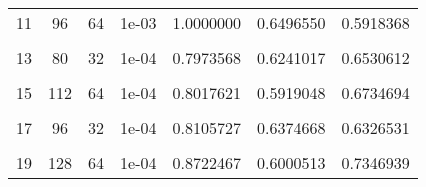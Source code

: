 \documentclass[
]{article}
\begin{document}
\begin{longtable}[t]{ccccccc}
11 & 96 & 64 & 1e-03 & 1.0000000 & 0.6496550 & 0.5918368\\
\cellcolor{gray!15}{12} & \cellcolor{gray!15}{128} & \cellcolor{gray!15}{48} & \cellcolor{gray!15}{1e-03} & \cellcolor{gray!15}{1.0000000} & \cellcolor{gray!15}{0.5759395} & \cellcolor{gray!15}{0.6326531}\\
13 & 80 & 32 & 1e-04 & 0.7973568 & 0.6241017 & 0.6530612\\
\cellcolor{gray!15}{14} & \cellcolor{gray!15}{64} & \cellcolor{gray!15}{64} & \cellcolor{gray!15}{1e-04} & \cellcolor{gray!15}{1.0000000} & \cellcolor{gray!15}{0.6047984} & \cellcolor{gray!15}{0.5918368}\\
15 & 112 & 64 & 1e-04 & 0.8017621 & 0.5919048 & 0.6734694\\
\cellcolor{gray!15}{16} & \cellcolor{gray!15}{96} & \cellcolor{gray!15}{32} & \cellcolor{gray!15}{1e-03} & \cellcolor{gray!15}{0.8237885} & \cellcolor{gray!15}{0.5869635} & \cellcolor{gray!15}{0.6734694}\\
17 & 96 & 32 & 1e-04 & 0.8105727 & 0.6374668 & 0.6326531\\
\cellcolor{gray!15}{18} & \cellcolor{gray!15}{80} & \cellcolor{gray!15}{48} & \cellcolor{gray!15}{1e-04} & \cellcolor{gray!15}{1.0000000} & \cellcolor{gray!15}{0.6599643} & \cellcolor{gray!15}{0.5918368}\\
19 & 128 & 64 & 1e-04 & 0.8722467 & 0.6000513 & 0.7346939\\*
\end{longtable}
\endgroup{}
\end{document}
